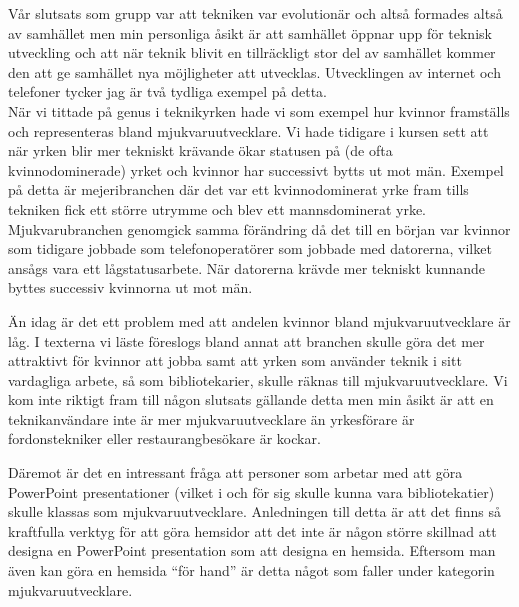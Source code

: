 \documentclass[12pt,a4paper]{article}
\begin{document}
Vår slutsats som grupp var att tekniken var evolutionär och altså formades altså av samhället men min personliga åsikt är att samhället öppnar upp för teknisk utveckling och att när teknik blivit en tillräckligt stor del av samhället kommer den att ge samhället nya möjligheter att utvecklas.
Utvecklingen av internet och telefoner tycker jag är två tydliga exempel på detta.\\

\noindent När vi tittade på genus i teknikyrken hade vi som exempel hur kvinnor framställs och representeras bland mjukvaruutvecklare.
Vi hade tidigare i kursen sett att när yrken blir mer tekniskt krävande ökar statusen på (de ofta kvinnodominerade) yrket och kvinnor har successivt bytts ut mot män.
Exempel på detta är mejeribranchen där det var ett kvinnodominerat yrke fram tills tekniken fick ett större utrymme och blev ett mannsdominerat yrke.
Mjukvarubranchen genomgick samma förändring då det till en början var kvinnor som tidigare jobbade som telefonoperatörer som jobbade med datorerna, vilket ansågs vara ett lågstatusarbete.
När datorerna krävde mer tekniskt kunnande byttes successiv kvinnorna ut mot män.

Än idag är det ett problem med att andelen kvinnor bland mjukvaruutvecklare är låg.
I texterna vi läste föreslogs bland annat att branchen skulle göra det mer attraktivt för kvinnor att jobba samt att yrken som använder teknik i sitt vardagliga arbete, så som bibliotekarier, skulle räknas till mjukvaruutvecklare.
Vi kom inte riktigt fram till någon slutsats gällande detta men min åsikt är att en teknikanvändare inte är mer mjukvaruutvecklare än yrkesförare är fordonstekniker eller restaurangbesökare är kockar.

Däremot är det en intressant fråga att personer som arbetar med att göra PowerPoint presentationer (vilket i och för sig skulle kunna vara bibliotekatier) skulle klassas som mjukvaruutvecklare.
Anledningen till detta är att det finns så kraftfulla verktyg för att göra hemsidor att det inte är någon större skillnad att designa en PowerPoint presentation som att designa en hemsida.
Eftersom man även kan göra en hemsida ``för hand'' är detta något som faller under kategorin mjukvaruutvecklare.
\end{document}
